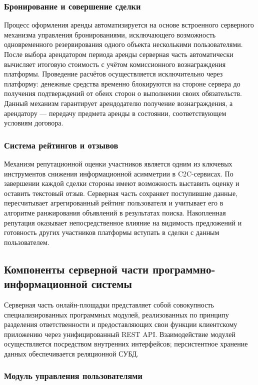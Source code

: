 \subsubsection{Бронирование и совершение сделки}
 
Процесс оформления аренды автоматизируется на основе встроенного серверного механизма управления бронированиями, исключающего возможность одновременного резервирования одного объекта несколькими пользователями. После выбора арендатором периода аренды серверная часть автоматически вычисляет итоговую стоимость с учётом комиссионного вознаграждения платформы. Проведение расчётов осуществляется исключительно через платформу: денежные средства временно блокируются на стороне сервера до получения подтверждений от обеих сторон о выполнении своих обязательств. Данный механизм гарантирует арендодателю получение вознаграждения, а арендатору — передачу предмета аренды в состоянии, соответствующем условиям договора.
 
\subsubsection{Система рейтингов и отзывов}
 
Механизм репутационной оценки участников является одним из ключевых инструментов снижения информационной асимметрии в C2C-сервисах. По завершении каждой сделки стороны имеют возможность выставить оценку и оставить текстовый отзыв. Серверная часть сохраняет поступившие данные, пересчитывает агрегированный рейтинг пользователя и учитывает его в алгоритме ранжирования объявлений в результатах поиска. Накопленная репутация оказывает непосредственное влияние на видимость предложений и готовность других участников платформы вступать в сделки с данным пользователем.
 
\subsection{Компоненты серверной части программно-информационной системы}
 
Серверная часть онлайн-площадки представляет собой совокупность специализированных программных модулей, реализованных по принципу разделения ответственности и предоставляющих свои функции клиентскому приложению через унифицированный REST API. Взаимодействие модулей осуществляется посредством внутренних интерфейсов; персистентное хранение данных обеспечивается реляционной СУБД.
 
\subsubsection{Модуль управления пользователями}
 
